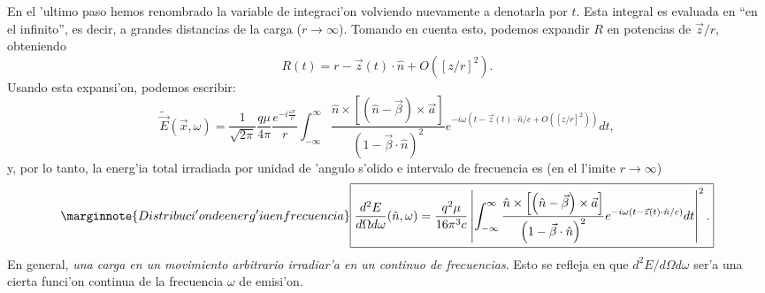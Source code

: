 En el 'ultimo paso hemos renombrado la variable de integraci'on volviendo
nuevamente a denotarla por $t$. Esta integral es evaluada en ``en el infinito'', es decir, a grandes distancias de la carga ($r\rightarrow\infty$). Tomando en cuenta esto, podemos expandir $R$ en potencias de ${\vec{z}}/{r}$, obteniendo
\begin{equation}
R(t)  =r-\vec{z}(t) \cdot\hat{n}+O\left(\left[z/r\right]^2\right). \label{expR} %
\end{equation}
Usando esta expansi'on, podemos escribir:
\begin{equation}
\tilde{\vec{E}}(\vec{x},\omega)=\frac{1}{\sqrt{2\pi}}\frac{q\mu}{4\pi}\frac{e^{-i\frac{\omega r}{c}}}{r}\int_{-\infty}^{\infty}\frac{\hat{n}\times\left[ \left( \hat{n}-\vec{\beta}\right)
\times{\vec{a}}\right] }{\left( 1-\vec{\beta}\cdot\hat{n}\right)^2}
e^{-i\omega (t-\vec{z}(t)\cdot\hat{n}/c+O([z/r]^2))} dt,
\end{equation}
y, por lo tanto, la energ'ia total irradiada por unidad de 'angulo s'olido e
intervalo de frecuencia es (en el l'imite $r\to\infty$)
\begin{equation}\marginnote{Distribuci'on de energ'ia en frecuencia}
\boxed{\frac{d^2E}{d\Omega d\omega}(\hat{n},\omega)
=\frac{q^2\mu}{16\pi^3c}\left|\int_{-\infty}^{\infty
}\frac{\hat{n}\times\left[ \left( \hat{n}-\vec{\beta}\right)
\times{\vec{a}}\right] }{\left( 1-\vec{\beta}\cdot\hat{n}\right)^2}
e^{-i\omega (t-\vec{z}(t)\cdot\hat{n}/c)} dt\right|^2 .} \label{dEdOdo}
\end{equation}
En general, \textit{una carga en un movimiento arbitrario irradiar'a en un continuo de frecuencias}. Esto se refleja en que ${d^2E}/{d\Omega d\omega}$ ser'a una cierta funci'on continua de la frecuencia $\omega$ de emisi'on.

